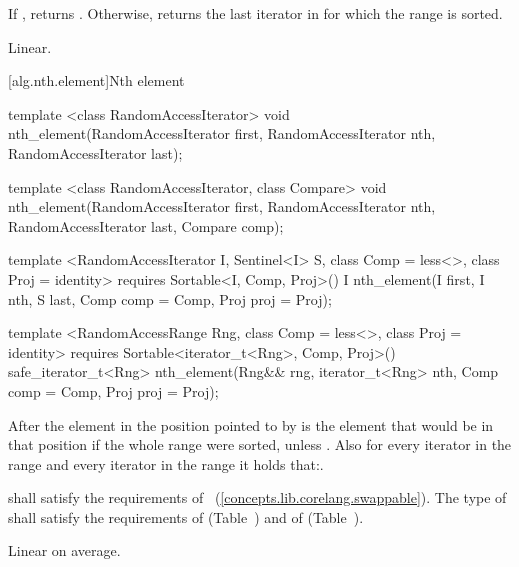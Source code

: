 \begin{itemdescr}
\pnum
\returns If , returns
. Otherwise, returns
the last iterator  in  for which the
range  is sorted.

\pnum
\complexity Linear.
\end{itemdescr}

[alg.nth.element]{Nth element}

%
\begin{removedblock}
\begin{itemdecl}
template <class RandomAccessIterator>
  void nth_element(RandomAccessIterator first, RandomAccessIterator nth,
                   RandomAccessIterator last);

template <class RandomAccessIterator, class Compare>
  void nth_element(RandomAccessIterator first, RandomAccessIterator nth,
                   RandomAccessIterator last,  Compare comp);
\end{itemdecl}
\end{removedblock}
\begin{addedblock}
\begin{itemdecl}
template <RandomAccessIterator I, Sentinel<I> S, class Comp = less<>,
    class Proj = identity>
  requires Sortable<I, Comp, Proj>()
  I nth_element(I first, I nth, S last, Comp comp = Comp{}, Proj proj = Proj{});

template <RandomAccessRange Rng, class Comp = less<>, class Proj = identity>
  requires Sortable<iterator_t<Rng>, Comp, Proj>()
  safe_iterator_t<Rng>
    nth_element(Rng&& rng, iterator_t<Rng> nth, Comp comp = Comp{}, Proj proj = Proj{});
\end{itemdecl}
\end{addedblock}

\begin{itemdescr}
\pnum
After
the element in the position pointed to by 
is the element that would be
in that position if the whole range were sorted, unless .
Also for every iterator
in the range
and every iterator
in the range
it holds that:.

\begin{removedblock}
\pnum
\requires
{} shall satisfy the requirements of
~(\ref{concepts.lib.corelang.swappable}). The type
of  shall satisfy the requirements of
 (Table~) and of
 (Table~).
\end{removedblock}

\pnum
\complexity
Linear on average.
\end{itemdescr}

